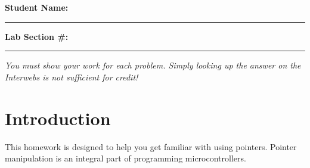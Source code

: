 



\noindent\textbf{Student Name:} \rule{8cm}{1pt} 

\noindent\textbf{Lab Section \#:} \rule{3cm}{1pt}

\emph{
You must show your work for each problem. Simply looking up the answer on the Interwebs is not sufficient for credit!
}

\section*{Introduction}
This homework is designed to help you get familiar with using pointers. Pointer manipulation is an integral part of programming microcontrollers.

